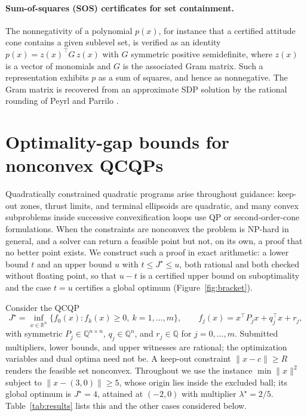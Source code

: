 \documentclass[11pt]{article}
\newcommand{\R}{\mathbb{R}}
\newcommand{\Q}{\mathbb{Q}}
\theoremstyle{plain}
\theoremstyle{remark}
\begin{document}
\paragraph{Sum-of-squares (SOS) certificates for set containment.}
The nonnegativity of a polynomial $p(x)$, for instance that a certified attitude
cone contains a given sublevel set, is verified as an identity
$p(x) = z(x)^\top G\, z(x)$ with $G$ symmetric positive semidefinite, where
$z(x)$ is a vector of monomials and $G$ is the associated Gram matrix. Such a
representation exhibits $p$ as a sum of squares, and hence as nonnegative. The Gram matrix is recovered from an approximate SDP
solution by the rational rounding of Peyrl and Parrilo \cite{peyrl2008}.

\section{Optimality-gap bounds for nonconvex QCQPs}
\label{sec:bracket}

Quadratically constrained quadratic programs arise throughout guidance: keep-out
zones, thrust limits, and
terminal ellipsoids are quadratic, and many convex subproblems inside
successive convexification loops use QP or second-order-cone formulations.
When the constraints are nonconvex the problem is NP-hard in general, and a
solver can return a feasible point but not, on its own, a proof that no better
point exists. We construct such a proof in exact arithmetic: a lower bound $t$
and an upper bound $u$ with $t \le J^\star \le u$, both rational and both checked
without floating point, so that $u - t$ is a certified upper bound on
suboptimality and the
case $t = u$ certifies a global optimum (Figure~\ref{fig:bracket}).

Consider the QCQP
\begin{equation}
J^\star = \inf_{x \in \R^n}\Big\{ f_0(x) : f_k(x) \ge 0,\ k = 1, \dots, m \Big\},
\qquad f_j(x) = x^\top P_j x + q_j^\top x + r_j,
\label{eq:qcqp}
\end{equation}
with symmetric $P_j\in\Q^{n\times n}$, $q_j\in\Q^n$, and $r_j\in\Q$ for
$j=0,\ldots,m$. Submitted multipliers, lower bounds, and upper witnesses are
rational; the optimization variables and dual optima need not be. A keep-out
constraint $\lVert x - c \rVert \ge R$ renders
the feasible set nonconvex. Throughout we use the instance
$\min \lVert x \rVert^2$ subject to $\lVert x - (3,0) \rVert \ge 5$, whose origin
lies inside the excluded ball; its global optimum is $J^\star = 4$, attained at
$(-2, 0)$ with multiplier $\lambda^\star = 2/5$. Table~\ref{tab:results} lists
this and the other cases considered below.
\end{document}
